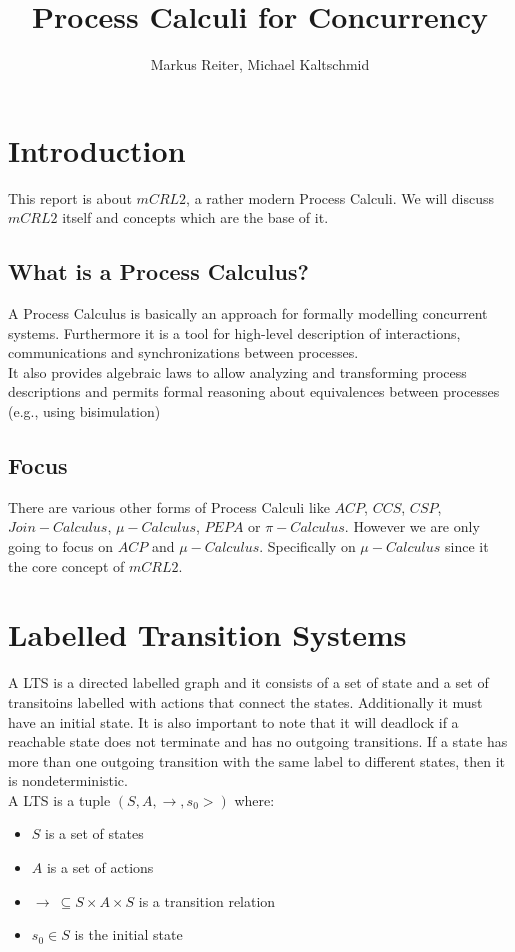 \documentclass{report}
\title{Process Calculi for Concurrency}
\author{Markus Reiter, Michael Kaltschmid}
\begin{document}
  \maketitle
  \tableofcontents

  \section{Introduction}
  This report is about $mCRL2$, a rather modern Process Calculi. We will discuss $mCRL2$ itself and concepts which are the base of it.
  \subsection{What is a Process Calculus?}
  A Process Calculus is basically an approach for formally modelling concurrent systems.
  Furthermore it is a tool for high-level description of interactions, communications and synchronizations between processes. \\
  It also provides algebraic laws to allow analyzing and transforming process descriptions and permits formal reasoning about equivalences between processes (e.g., using bisimulation) \\

  \subsection{Focus}
  There are various other forms of Process Calculi like $ACP$, $CCS$, $CSP$, $Join-Calculus$, $\mu-Calculus$, $PEPA$ or $\pi-Calculus$. However we are only going to focus on $ACP$ and $\mu-Calculus$. Specifically on $\mu-Calculus$ since it the core concept of $mCRL2$.

  \section{Labelled Transition Systems}
  A LTS is a directed labelled graph and it consists of a set of state and a set of transitoins labelled with actions that connect the states. Additionally it must have an initial state. It is also important to note that it will deadlock if a reachable state does not terminate and has no outgoing
  transitions. If a state has more than one outgoing transition with the same label to different states, then it is nondeterministic. \\[12pt]
  A LTS is a tuple $(S, A, \to,s_0>)$ where: \\

  \begin{itemize}[noitemsep]
    \item $S$ is a set of states \\
    \item $A$ is a set of actions \\
    \item $\to\ \subseteq S \times A \times S$ is a transition relation \\
    \item $s_0 \in S$ is the initial state \\
  \end{itemize}
\end{document}
